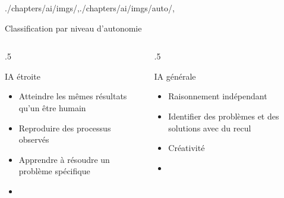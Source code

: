 \begin{graphicspathcontext}{{./chapters/ai/imgs/},{./chapters/ai/imgs/auto/},\old}

\begin{frame}[c]{Classification par niveau d'autonomie}
	\begin{columns}
		\begin{column}{.5\linewidth}
			\begin{definitionblock}{IA étroite}
				\begin{itemize}
					\item Atteindre les mêmes résultats qu'un être humain
					\item Reproduire des processus observés
					\item Apprendre à résoudre un problème spécifique
					\item {}
				\end{itemize}
			\end{definitionblock}
		\end{column}
		\begin{column}{.5\linewidth}
			\begin{definitionblock}{IA générale}
				\begin{itemize}
					\item Raisonnement indépendant
					\item Identifier des problèmes et des solutions avec du recul
					\item Créativité
					\item {}
				\end{itemize}
			\end{definitionblock}
		\end{column}
	\end{columns}
\end{frame}

\end{graphicspathcontext}

\endinput

